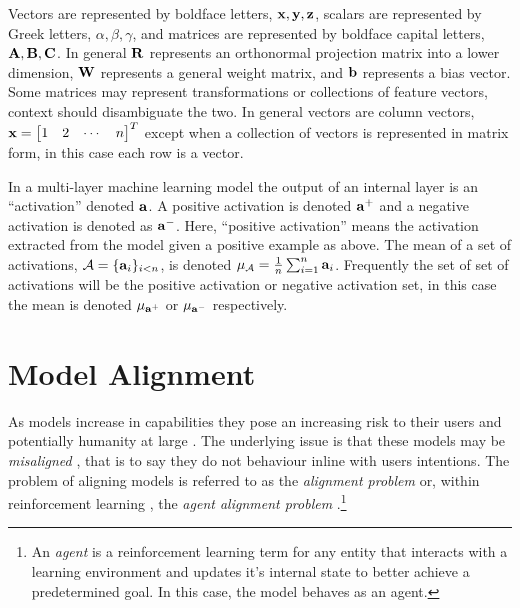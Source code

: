 Vectors are represented by boldface letters, $\mathbf{x}, \mathbf{y}, \mathbf{z}$, scalars are represented by Greek letters, $\alpha, \beta, \gamma$, and matrices are represented by boldface capital letters, $\mathbf{A}, \mathbf{B}, \mathbf{C}$.
In general $\mathbf{R}$ represents an orthonormal projection matrix into a lower dimension, $\mathbf{W}$ represents a general weight matrix, and $\mathbf{b}$ represents a bias vector.
Some matrices may represent transformations or collections of feature vectors, context should disambiguate the two.
In general vectors are column vectors, $\vx = \begin{bmatrix*}
    1 & 2 & \cdots & n
\end{bmatrix*}^T$ except when a collection of vectors is represented in matrix form, in this case each row is a vector.

In a multi-layer machine learning model the output of an internal layer is an ``activation'' denoted $\mathbf{a}$.
A positive activation is denoted $\mathbf{a}^+$ and a negative activation is denoted as $\mathbf{a}^-$. Here, ``positive activation'' means the activation extracted from the model given a positive example as above.
The mean of a set of activations, $\mathcal{A} = \{\mathbf{a}_i\}_{i < n}$, is denoted $\mu_\mathcal{A} = \frac{1}{n}\sum_{i=1}^{n}\mathbf{a}_i$.
Frequently the set of set of activations will be the positive activation or negative activation set, in this case the mean is denoted $\mu_{\mathbf{a}^+}$ or $\mu_{\mathbf{a}^-}$ respectively.

\section{Model Alignment}

As models increase in capabilities \citep{dynabench, hle, gpt-5, grok-4} they pose an increasing risk to their users \citep{c.ai, psychosis} and potentially humanity at large \citep{survellience, deepfakes, disempowerment}.
The underlying issue is that these models may be \emph{misaligned} \citep{agent-alignment}, that is to say they do not behaviour inline with users intentions.
The problem of aligning models is referred to as the \emph{alignment problem} or, within reinforcement learning \cite{rl}, the \emph{agent alignment problem} \citep{agent-alignment}.\footnote{An \emph{agent} is a reinforcement learning term for any entity that interacts with a learning environment and updates it's internal state to better achieve a predetermined goal. In this case, the model behaves as an agent.}

